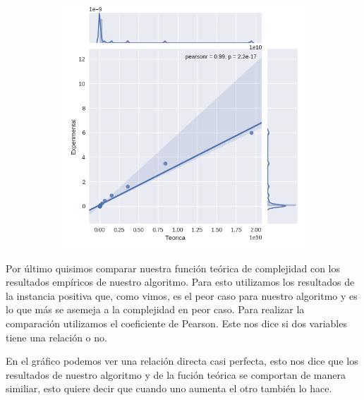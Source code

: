 	\begin{figure}[h]
	\begin{subfigure}{0.5\textwidth}
	\includegraphics[scale=0.45]{Pearson.png}	
	\end{subfigure}
	\end{figure}  
	
	Por último quisimos comparar nuestra función teórica de complejidad con los resultados empíricos de nuestro algoritmo. Para esto utilizamos los resultados de la instancia positiva que, como vimos, es el peor caso para nuestro algoritmo y es lo que más se asemeja a la complejidad en peor caso. Para realizar la comparación utilizamos el coeficiente de Pearson. Este nos dice si dos variables tiene una relación o no. 
	
	
	 
	
	En el gráfico podemos ver una relación directa casi perfecta, esto nos dice que los resultados de nuestro algoritmo y de la fución teórica se comportan de manera similiar, esto quiere decir que cuando uno aumenta el otro también lo hace. 
	 
	



